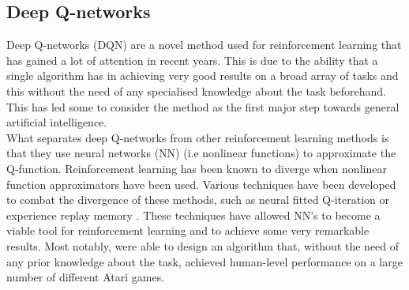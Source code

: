 \subsection{Deep Q-networks}
Deep Q-networks (DQN) \cite{mnih2013playing} are a novel method used for reinforcement learning that has gained a lot of attention in recent years. This is due to the ability that a single algorithm has in achieving very good results on a broad array of tasks and this without the need of any specialised knowledge about the task beforehand. This has led some to consider the method as the first major step towards general artificial intelligence.\\
What separates deep Q-networks from other reinforcement learning methods is that they use neural networks (NN) (i.e nonlinear functions) to approximate the Q-function. Reinforcement learning has been known to diverge when nonlinear function approximators have been used. Various techniques have been developed to combat the divergence of these methods, such as neural fitted Q-iteration \cite{riedmiller2005neural} or experience replay memory \cite{Mnih2015}. These techniques have allowed NN's to become a viable tool for reinforcement learning and to achieve some very remarkable results. Most notably, \cite{Mnih2015} were able to design an algorithm that, without the need of any prior knowledge about the task, achieved human-level performance on a large number of different Atari games.

































